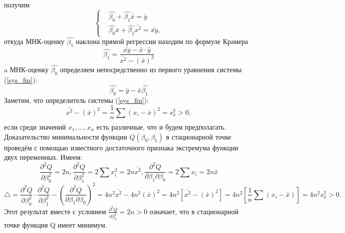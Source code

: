 \documentclass[12pt,a4paper]{scrartcl}
\begin{document}
	получим
		\begin{equation}
	   \begin{cases}
         & \hat{\beta_{0}} + \hat{\beta_{1}}\bar{x} = 
         \bar{y}\\ 
        & \hat{\beta_{0}}\bar{x} + \hat{\beta_{1}}\bar{x^{2}} = \bar{xy},
       \end{cases}
       \label{sys_fin}
	\end{equation}
	откуда МНК-оценку $\hat{\beta_{1}}$ наклона прямой регрессии находим по формуле Крамера
	\begin{equation}
	    \hat{\beta_{1}} = \frac{\bar{xy} - \bar{x} \cdot \bar{y}}{\bar{x^{2}} - (\bar{x})^{2}}
	    \label{beta_1_new}
	\end{equation}
	a МНК-оценку $\hat{\beta_{0}}$  определяем непосредственно из первого уравнения системы (\ref{sys_fin}):
	\begin{equation}
	    \hat{\beta_{0}} = \bar{y} - \bar{x}\hat{\beta_{1}}
	    \label{beta_0_new}
	\end{equation}
	Заметим, что определитель системы (\ref{sys_fin}):
	\begin{equation}
	    \bar{x^{2}} - (\bar{x})^{2} = \frac{1}{n}\sum_{}{}{(x_{i} - \bar{x})^{2}} = s_{x}^{2} > 0, 
	\end{equation}
	если среди значений $x_{1},...,x_{n}$ есть различные, что и будем предполагать.
	\newline
	Доказательство минимальности функции $Q(\beta_{0}, \beta_{1})$ в стационарной точке проведём с помощью известного достаточного признака экстремума функции двух переменных. Имеем:
	\begin{equation}
	    \frac{\partial ^{2} Q}{\partial \beta_{0}^{2}} = 2n, 
        \frac{\partial ^{2} Q}{\partial \beta_{1}^{2}} = 2\sum_{}{}{x_{i}^{2}} = 2n\bar{x^{2}}, 
        \frac{\partial ^{2} Q}{\partial \beta_{1} \partial \beta_{0}} = 2\sum_{}{}{x_{i}} = 2n\bar{x}
        \label{frac_eq}
	\end{equation}
	\begin{equation}
	    \bigtriangleup = \frac{\partial^{2}Q}{\partial \beta_{0}^{2}} \cdot \frac{\partial^{2}Q}{\partial \beta_{1}^{2}} - (\frac{\partial^{2}Q}{\partial \beta_{1} \partial \beta_{0}})^{2} = 
	    4n^{2}\bar{x^{2}} - 4n^2(\bar{x})^{2} = 
	    4n^{2}\left[\bar{x^{2}} - (\bar{x})^{2}\right] = 4n^{2}\left[ \frac{1}{n}\sum{}_{}{(x_{i} - \bar{x})}\right] = 4n^{2}s_{x}^{2} > 0.
	    \label{det_sys}
	\end{equation}
	Этот результат вместе с условием $\frac{\partial^{2}Q}{\partial \beta_{0}^{2}} = 2n > 0$ означает, что в стационарной точке функция Q имеет минимум.
\end{document}
